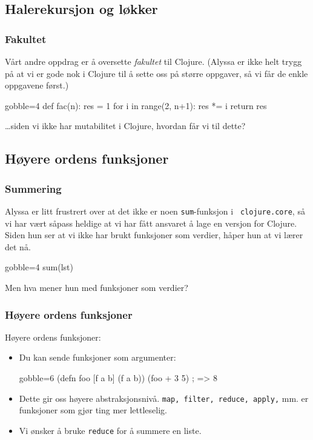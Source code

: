 \documentclass{beamer}
\begin{document}
\subsection{Halerekursjon og løkker}
\begin{frame}[fragile]
  \frametitle{Fakultet}

  Vårt andre oppdrag er å oversette {\em fakultet} til Clojure. (Alyssa er ikke
  helt trygg på at vi er gode nok i Clojure til å sette oss på større oppgaver,
  så vi får de enkle oppgavene først.)

  \vspace{3mm}
  \vspace{3mm}
  \begin{pycode*}{gobble=4}
    def fac(n):
        res = 1
        for i in range(2, n+1):
            res *= i
        return res
  \end{pycode*}
  \vspace{2mm}

  \ldots siden vi ikke har mutabilitet i Clojure, hvordan får vi til dette?
\end{frame}

\subsection{Høyere ordens funksjoner}
\begin{frame}[fragile, t]
  \frametitle{Summering}

  Alyssa er litt frustrert over at det ikke er noen {\tt sum}-funksjon i {\tt
    clojure.core}, så vi har vært såpass heldige at vi har fått ansvaret å lage
  en versjon for Clojure. Siden hun ser at vi ikke har brukt funksjoner som
  verdier, håper hun at vi lærer det nå.

  \vspace{3mm}
  \begin{pycode*}{gobble=4}
    sum(lst)
  \end{pycode*}

  \vspace{3mm}
  Men hva mener hun med funksjoner som verdier?
\end{frame}

\begin{frame}[fragile, t]
  \frametitle{Høyere ordens funksjoner}

  Høyere ordens funksjoner:
  \begin{itemize}
  \item<2-> Du kan sende funksjoner som argumenter:
    \begin{cljcode*}{gobble=6}
      (defn foo [f a b]
        (f a b))
      (foo + 3 5) ; => 8
    \end{cljcode*}
  \item<3-> Dette gir oss høyere abstraksjonsnivå. {\tt map, filter, reduce,
    apply,} mm. er funksjoner som gjør ting mer lettleselig.
  \item<4-> Vi ønsker å bruke {\tt reduce} for å summere en liste.
  \end{itemize}
\end{frame}
\end{document}
